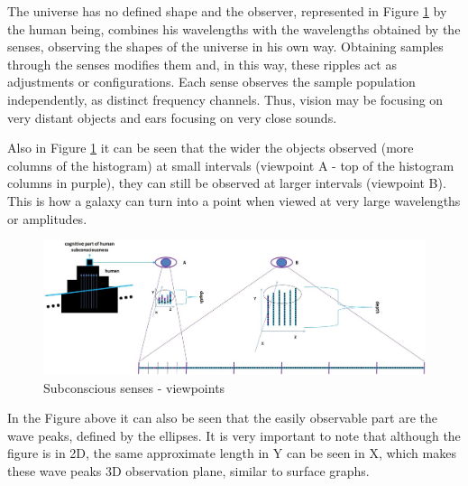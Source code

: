 The universe has no defined shape and the observer, represented in Figure \ref{fig:consciousness_amplitude_viewpoint} by the human being, combines his wavelengths with the wavelengths obtained by the senses, observing the shapes of the universe in his own way. Obtaining samples through the senses modifies them and, in this way, these ripples act as adjustments or configurations. Each sense observes the sample population independently, as distinct frequency channels. Thus, vision may be focusing on very distant objects and ears focusing on very close sounds.

Also in Figure \ref{fig:consciousness_amplitude_viewpoint} it can be seen that the wider the objects observed (more columns of the histogram) at small intervals (viewpoint A - top of the histogram columns in purple), they can still be observed at larger intervals (viewpoint B). This is how a galaxy can turn into a point when viewed at very large wavelengths or amplitudes.
	\begin{figure}[H]
	\caption{Subconscious senses - viewpoints}
	\label{fig:consciousness_amplitude_viewpoint}
	\centering
	\includegraphics[scale=.4]{sections/images/consciousness_amplitude_viewpoint.jpg}
	\end{figure}

In the Figure above it can also be seen that the easily observable part are the wave peaks, defined by the ellipses. It is very important to note that although the figure is in 2D, the same approximate length in Y can be seen in X, which makes these wave peaks 3D observation plane, similar to surface graphs.

